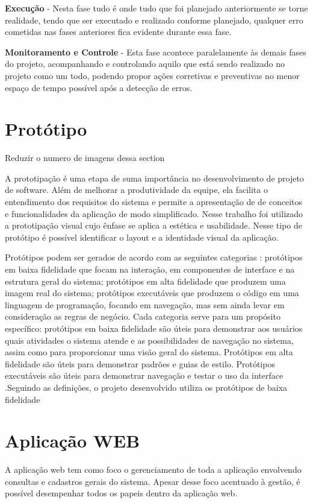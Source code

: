 {	{\textbf{Execução} - Nesta fase tudo é onde tudo que foi planejado anteriormente se torne realidade, tendo que ser executado e realizado conforme planejado, qualquer erro cometidas nas fases anteriores fica evidente durante essa fase. }
	
	{\textbf{Monitoramento e Controle} - Esta fase acontece paralelamente às demais fases do projeto, acompanhando e controlando aquilo que está sendo realizado no projeto como um todo, podendo propor ações corretivas e preventivas no menor espaço de tempo possível após a detecção de erros.}
	
	
	\section{Protótipo}
	
	{\color{red} Reduzir o numero de imagens dessa section}
	
	A prototipação é uma etapa de suma importância no desenvolvimento de projeto de software. Além de melhorar a produtividade da equipe, ela facilita o entendimento dos requisitos do sistema e permite a apresentação de de conceitos e funcionalidades da aplicação de modo simplificado.
	Nesse trabalho foi utilizado a prototipação visual cujo ênfase se aplica a estética e usabilidade. Nesse tipo de protótipo é possível identificar o layout e a identidade visual da aplicação. \cite{dextra2013prototipacao}
	
	{Protótipos podem ser gerados de acordo com as seguintes categorias \cite{coyette2004sketchixml}: protótipos em baixa fidelidade que focam na interação, em componentes de interface e na estrutura geral do sistema; protótipos em alta fidelidade que produzem uma imagem real do sistema; protótipos executáveis que produzem o código em uma linguagem de programação, focando em navegação, mas sem ainda levar em consideração as regras de negócio. Cada categoria serve para um propósito específico: protótipos em baixa fidelidade são úteis para demonstrar aos usuários quais atividades o sistema atende e as possibilidades de navegação no sistema, assim como para proporcionar uma visão geral do sistema. Protótipos em alta fidelidade são úteis para demonstrar padrões e guias de estilo. Protótipos executáveis são úteis para demonstrar navegação e testar o uso da interface \cite{rosemberg2008prototipaccao}.Seguindo as definições, o projeto desenvolvido utiliza os protótipos de baixa fidelidade}
	
	\section{Aplicação WEB}
	A aplicação web tem como foco o gerenciamento de toda a aplicação envolvendo consultas e cadastros gerais do sistema.
	Apesar desse foco acentuado à gestão, é possível desempenhar todos os papeis dentro da aplicação web.
	
}
